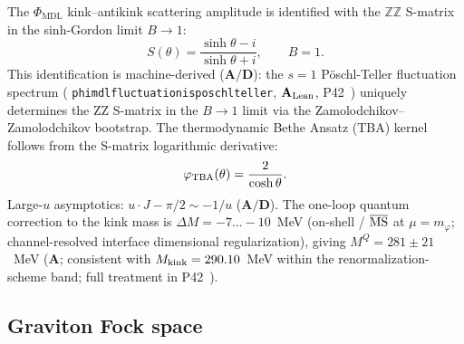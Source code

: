 \documentclass[11pt]{article}
\theoremstyle{remark}
\newcommand{\PHIMDL}{\Phi_{\mathrm{MDL}}}
\newcommand{\lean}[1]{%
  \penalty-100
  \begingroup\def\_{\textunderscore\allowbreak}\texttt{#1}\endgroup}
\newcommand{\Mkink}{M_{\rm kink}}
\newcommand{\CatA}{\textbf{A}}
\newcommand{\CatAL}{\ensuremath{\textbf{A}_{\rm Lean}}}
\newcommand{\CatAD}{\textbf{A/D}}
\begin{document}
The $\PHIMDL$ kink--antikink scattering amplitude is identified with the
$\mathbb{Z}\mathbb{Z}$ S-matrix in the sinh-Gordon limit $B\to 1$:
\begin{equation}
  S(\theta) = \frac{\sinh\theta - i}{\sinh\theta + i}, \qquad B = 1.
  \label{eq:zz_smatrix}
\end{equation}
This identification is machine-derived ($\CatAD$): the $s=1$ Pöschl-Teller
fluctuation spectrum (\lean{phimdl\_fluctuation\_is\_poschl\_teller}, $\CatAL$,
P42~\cite{SpivackPhiMDLField}) uniquely determines the ZZ S-matrix in the
$B\to1$ limit via the Zamolodchikov--Zamolodchikov bootstrap.
The thermodynamic Bethe Ansatz (TBA) kernel follows from the S-matrix logarithmic derivative:
\begin{equation}
  \varphi_{\rm TBA}(\theta) = \frac{2}{\cosh\theta}.
  \label{eq:tba_kernel}
\end{equation}
Large-$u$ asymptotics: $u\cdot J - \pi/2 \sim -1/u$ ($\CatAD$).
The one-loop quantum correction to the kink mass is
$\Delta M = -7\ldots-10$~MeV (on-shell / $\overline{\rm MS}$ at $\mu = m_\varphi$;
channel-resolved interface dimensional regularization), giving
$M^Q = 281 \pm 21$~MeV ($\CatA$; consistent with $\Mkink = 290.10$~MeV within the
renormalization-scheme band; full treatment in P42~\cite{SpivackPhiMDLField}).

\subsection{Graviton Fock space}
\end{document}
